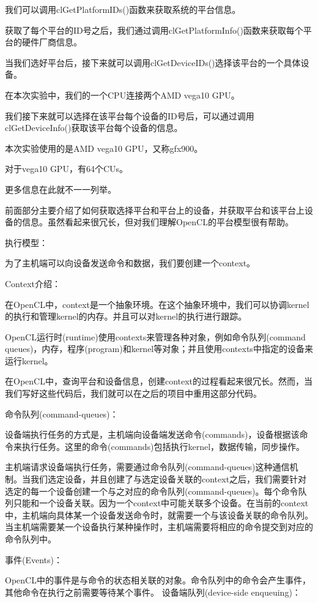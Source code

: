 我们可以调用clGetPlatformIDs()函数来获取系统的平台信息。

获取了每个平台的ID号之后，我们通过调用clGetPlatformInfo()函数来获取每个平台的硬件厂商信息。

当我们选好平台后，接下来就可以调用clGetDeviceIDs()选择该平台的一个具体设备。

在本次实验中，我们的一个CPU连接两个AMD vega10 GPU。

我们接下来就可以选择在该平台每个设备的ID号后，可以通过调用clGetDeviceInfo()获取该平台每个设备的信息。

本次实验使用的是AMD vega10 GPU，又称gfx900。

对于vega10 GPU，有64个CUs。

更多信息在此就不一一列举。

前面部分主要介绍了如何获取选择平台和平台上的设备，并获取平台和该平台上设备的信息。虽然看起来很冗长，但对我们理解OpenCL的平台模型很有帮助。

执行模型：

为了主机端可以向设备发送命令和数据，我们要创建一个context。

Context介绍：

在OpenCL中，context是一个抽象环境。在这个抽象环境中，我们可以协调kernel的执行和管理kernel的内存。并且可以对kernel的执行进行跟踪。

OpenCL运行时(runtime)使用contexts来管理各种对象，例如命令队列(command queues)，内存，程序(program)和kernel等对象；并且使用contexts中指定的设备来运行kernel。

在OpenCL中，查询平台和设备信息，创建context的过程看起来很冗长。然而，当我们写好这些代码后，我们就可以在之后的项目中重用这部分代码。

命令队列(command-queues)：

设备端执行任务的方式是，主机端向设备端发送命令(commands)，设备根据该命令来执行任务。这里的命令(commands)包括执行kernel，数据传输，同步操作。

主机端请求设备端执行任务，需要通过命令队列(command-queues)这种通信机制。当我们选定设备，并且创建了与选定设备关联的context之后，我们需要针对选定的每一个设备创建一个与之对应的命令队列(command-queues)。每个命令队列只能和一个设备关联。因为一个context中可能关联多个设备。在当前的context中，主机端向具体某一个设备发送命令时，就需要一个与该设备关联的命令队列。
当主机端需要某一个设备执行某种操作时，主机端需要将相应的命令提交到对应的命令队列中。

事件(Events)：

OpenCL中的事件是与命令的状态相关联的对象。命令队列中的命令会产生事件，其他命令在执行之前需要等待某个事件。
设备端队列(device-side enqueuing)：

